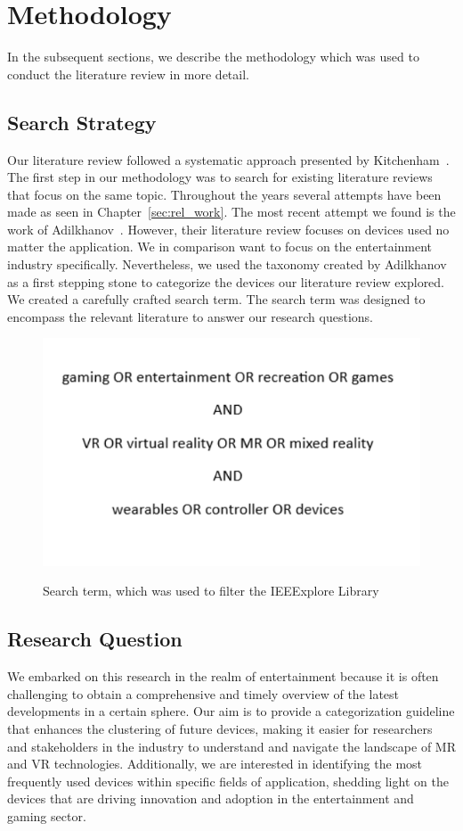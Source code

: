 \section{Methodology}
\label{sec:method}
In the subsequent sections, we describe the methodology which was used to conduct the literature review in more detail.

\subsection{Search Strategy}
Our literature review followed a systematic approach presented by Kitchenham~\cite{Kitchenham06}. The first step in our methodology was to search for existing literature reviews that focus on the same topic. Throughout the years several attempts have been made as seen in Chapter~\ref{sec:rel_work}. The most recent attempt we found is the work of Adilkhanov~\cite{Adilkhanov22}. However, their literature review focuses on devices used no matter the application. We in comparison want to focus on the entertainment industry specifically. Nevertheless, we used the taxonomy created by Adilkhanov as a first stepping stone to categorize the devices our literature review explored. We created a carefully crafted search term. The search term was designed to encompass the relevant literature to answer our research questions.

\begin{figure}[htbp]
	\includegraphics[width=\columnwidth]{figures/searchterm.pdf}
	\label{fig:searchterm}
	\caption{Search term, which was used to filter the IEEExplore Library}
\end{figure}


\subsection{Research Question}
We embarked on this research in the realm of entertainment because it is often challenging to obtain a comprehensive and timely overview of the latest developments in a certain sphere. Our aim is to provide a categorization guideline that enhances the clustering of future devices, making it easier for researchers and stakeholders in the industry to understand and navigate the landscape of MR and VR technologies. Additionally, we are interested in identifying the most frequently used devices within specific fields of application, shedding light on the devices that are driving innovation and adoption in the entertainment and gaming sector. 

